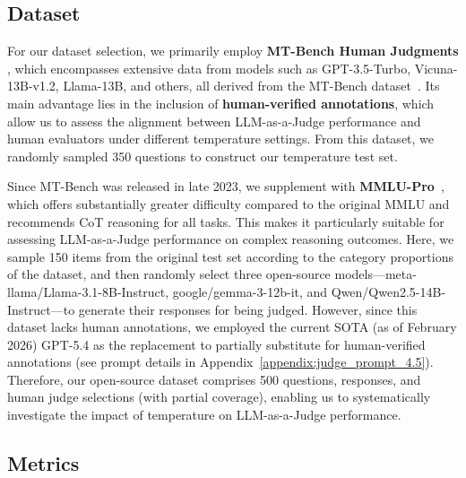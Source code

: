 \documentclass[11pt]{article}
\begin{document}
\subsection{Dataset}

For our dataset selection, we primarily employ \textbf{MT-Bench Human Judgments} \cite{10.5555/3666122.3668142}, which encompasses extensive data from models such as GPT-3.5-Turbo, Vicuna-13B-v1.2, Llama-13B, and others, all derived from the MT-Bench dataset~\cite{10.5555/3666122.3668142}. Its main advantage lies in the inclusion of \textbf{human-verified annotations}, which allow us to assess the alignment between LLM-as-a-Judge performance and human evaluators under different temperature settings. From this dataset, we randomly sampled 350 questions to construct our temperature test set.

Since MT-Bench was released in late 2023, we supplement with \textbf{MMLU-Pro}~\cite{10.5555/3737916.3740934}, which offers substantially greater difficulty compared to the original MMLU and recommends CoT reasoning for all tasks. This makes it particularly suitable for assessing LLM-as-a-Judge performance on complex reasoning outcomes. Here, we sample 150 items from the original test set according to the category proportions of the dataset, and then randomly select three open-source models---meta-llama/Llama-3.1-8B-Instruct, google/gemma-3-12b-it, and Qwen/Qwen2.5-14B-Instruct---to generate their responses for being judged. However, since this dataset lacks human annotations, we employed the current SOTA (as of February 2026) GPT-5.4 as the replacement to partially substitute for human-verified annotations (see prompt details in Appendix~\ref{appendix:judge_prompt_4.5}). Therefore, our open-source dataset comprises 500 questions, responses, and human judge selections (with partial coverage), enabling us to systematically investigate the impact of temperature on LLM-as-a-Judge performance.










\subsection{Metrics}
\end{document}
